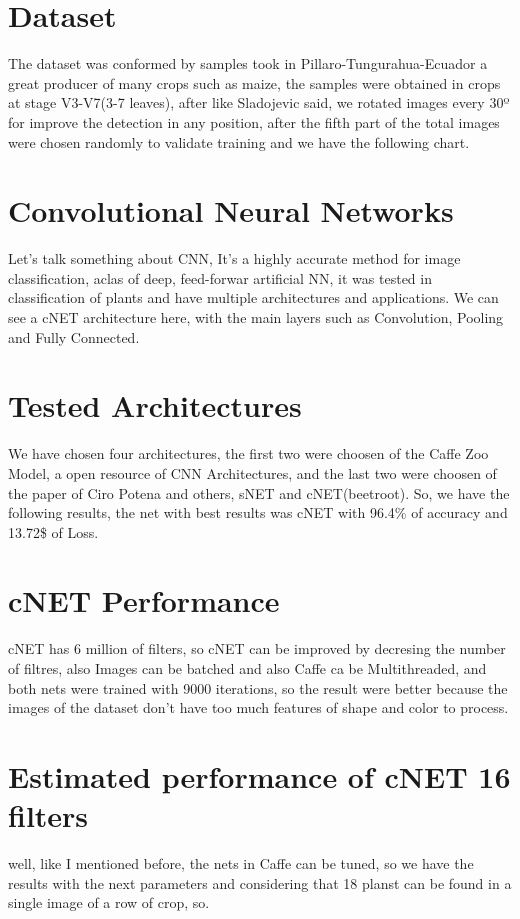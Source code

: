 \documentclass[10pt,a4paper]{proc}
\begin{document}
\section{Dataset}
The dataset was conformed by samples took in Pillaro-Tungurahua-Ecuador a great producer of many crops such as maize, the samples were obtained in crops at stage V3-V7(3-7 leaves), after like Sladojevic said, we rotated images every 30º for improve the detection in any position, after the fifth part of the total images were chosen randomly to validate training and we have the following chart. 
\section{Convolutional Neural Networks}
Let's talk something about CNN, It's a highly accurate method for image classification, aclas of deep, feed-forwar artificial NN, it was tested in classification of plants and have multiple architectures and applications. We  can see a cNET architecture here, with the main layers such as Convolution, Pooling and Fully Connected.
\section{Tested Architectures}
We have chosen four architectures, the first two were choosen of the Caffe Zoo Model, a open resource of CNN Architectures, and the last two were choosen of the paper of Ciro Potena and others, sNET and cNET(beetroot). So, we have the following results, the net with best results was cNET with 96.4\% of accuracy and 13.72\$ of Loss. 
\section{cNET Performance}
cNET has 6 million of filters, so cNET can be improved by decresing the number of filtres, also Images can be batched and also Caffe ca be Multithreaded, and both nets were trained with 9000 iterations, so the result were better because the images of the dataset don't have too much features of shape and color to process. 
\section{Estimated performance of cNET 16 filters}
well, like I mentioned before, the nets in Caffe can be tuned, so we have the results with the next parameters and considering that 18 planst can be found in a single image of a row of crop, so.
\end{document}
